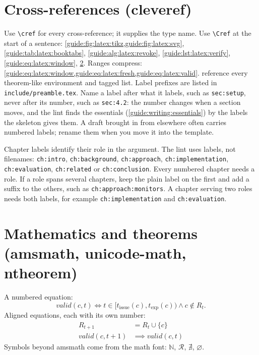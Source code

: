 \section{Cross-references (cleveref)}\label{guide:latex:cref}
Use \texttt{\textbackslash cref} for every cross-reference; it supplies the type name. Use \texttt{\textbackslash Cref} at the start of a sentence:
\cref{guide:fig:latex:tikz,guide:fig:latex:svg}, \cref{guide:tab:latex:booktabs}, \cref{guide:alg:latex:revoke}, \cref{guide:lst:latex:verify}, \cref{guide:eq:latex:window}, \cref{guide:latex:theorems}.
Ranges compress: \cref{guide:eq:latex:window,guide:eq:latex:fresh,guide:eq:latex:valid}.
 reference every theorem-like environment and tagged list.
Label prefixes are listed in \texttt{include/preamble.tex}.
Name a label after what it labels, such as \texttt{sec:setup}, never after its number, such as \texttt{sec:4.2}: the number changes when a section moves, and the lint finds the essentials (\cref{guide:writing:essentials}) by the labels the skeleton gives them. A draft brought in from elsewhere often carries numbered labels; rename them when you move it into the template.

Chapter labels identify their role in the argument. The lint uses labels, not filenames: \texttt{ch:intro}, \texttt{ch:background}, \texttt{ch:approach}, \texttt{ch:implementation}, \texttt{ch:evaluation}, \texttt{ch:related} or \texttt{ch:conclusion}. Every numbered chapter needs a role. If a role spans several chapters, keep the plain label on the first and add a suffix to the others, such as \texttt{ch:approach:monitors}. A chapter serving two roles needs both labels, for example \texttt{ch:implementation} and \texttt{ch:evaluation}.

\section{Mathematics and theorems (amsmath, unicode-math, ntheorem)}\label{guide:latex:theorems}
A numbered equation:
\begin{equation}\label{guide:eq:latex:window}
  \mathit{valid}(c, t) \iff t \in [t_\mathrm{issue}(c), t_\mathrm{exp}(c)) \land c \notin R_t .
\end{equation}
Aligned equations, each with its own number:
\begin{align}
  R_{t+1} &= R_t \cup \{ c \} \label{guide:eq:latex:fresh}\\
  \mathit{valid}(c, t+1) &\implies \mathit{valid}(c, t) \label{guide:eq:latex:valid}
\end{align}
Symbols beyond amsmath come from the math font: $\mathbb{N}$, $\mathcal{R}$, $\nexists$, $\varnothing$.

